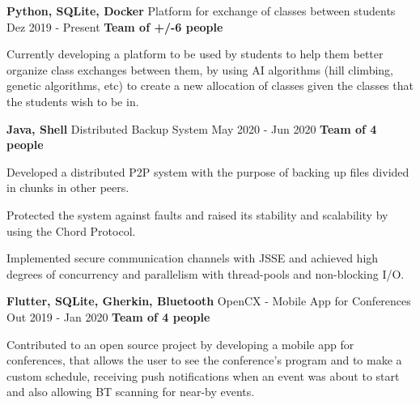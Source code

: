 
\begin{cventries}

  \cventry
    {\textbf{Python, SQLite, Docker}}
    {Platform for exchange of classes between students}
    {Dez 2019 - Present}
    {\textbf{Team of +/-6 people}}
    {
      \begin{cvitems} %
        \item {Currently developing a platform to be used by students to help them better organize class exchanges between them, by using AI algorithms (hill climbing, genetic algorithms, etc) to create a new allocation of classes given the classes that the students wish to be in.}
      \end{cvitems}
    }

  \cventry
    {\textbf{Java, Shell}} %
    {Distributed Backup System \href{https://github.com/EduRibeiro00/DistBackupService-feup-sdis}{\faExternalLink}} %
    {May 2020 - Jun 2020} %
    {\textbf{Team of 4 people}} %
    {
      \begin{cvitems} %
        \item {Developed a distributed P2P system with the purpose of backing up files divided in chunks in other peers.}
        \item{Protected the system against faults and raised its stability and scalability by using the Chord Protocol.}
        \item {Implemented secure communication channels with JSSE and achieved high degrees of concurrency and parallelism with thread-pools and non-blocking I/O.}
      \end{cvitems}
    }

  \cventry
    {\textbf{Flutter, SQLite, Gherkin, Bluetooth}} %
    {OpenCX - Mobile App for Conferences \href{https://github.com/open-cx/open-cx}{\faExternalLink}} %
    {Out 2019 - Jan 2020} %
    {\textbf{Team of 4 people}} %
    {
      \begin{cvitems} %
        \item {Contributed to an open source project by developing a mobile app for conferences, that allows the user to see the conference's program and to make a custom schedule, receiving push notifications when an event was about to start and also allowing BT scanning for near-by events.}
      \end{cvitems}
    }


\end{cventries}
